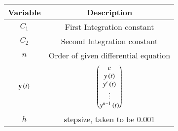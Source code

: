 \begin{tabular}[12pt]{ |c| c|}
    \hline
    \textbf{Variable} & \textbf{Description}\\ 
    \hline
    $C_1$ &First Integration constant\\
    \hline
    $C_2$ &Second Integration constant\\
    \hline
    $n$ & Order of given differential equation\\
    \hline
    $\mathbf{y}\left(t\right)$ & $\begin{pmatrix}c \\ y\left(t\right) \\ y^\prime\left(t\right) \\ \vdots \\ y^{n-1}\left(t\right)\end{pmatrix}$\\
    \hline
    $h$ & stepsize, taken to be 0.001\\
    \hline
    \end{tabular}
